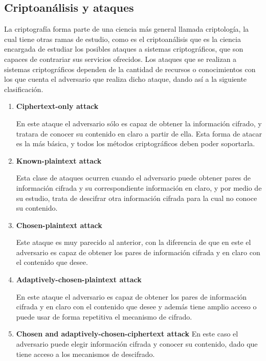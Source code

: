   \subsection{Criptoanálisis y ataques}

    La criptografía forma parte de una ciencia más general llamada
    criptología, la cual tiene otras ramas de estudio, como es el
    criptoanálisis que es la ciencia encargada de estudiar los posibles
    ataques a sistemas criptográficos, que son capaces de contrariar sus
    servicios ofrecidos.
    Los ataques que se realizan a sistemas criptográficos dependen de la 
    cantidad de recursos o conocimientos con los que cuenta el adversario 
    que realiza dicho ataque, dando así a la siguiente clasificación.

    \begin{enumerate}

      \item \textbf{Ciphertext-only attack}

        En este ataque el adversario sólo es capaz de obtener la información
        cifrado, y tratara de conocer su contenido en claro a partir de ella.
        Esta forma de atacar es la más básica, y todos los métodos
        criptográficos deben poder soportarla.

      \item \textbf{Known-plaintext attack}

        Esta clase de ataques ocurren cuando el adversario puede obtener pares
        de información cifrada y su correspondiente información en claro, y
        por medio de su estudio, trata de descifrar otra información cifrada
        para la cual no conoce su contenido.

      \item \textbf{Chosen-plaintext attack}

        Este ataque es muy parecido al anterior, con la diferencia de que en
        este el adversario es capaz de obtener los pares de información
        cifrada y en claro con el contenido que desee.

      \item \textbf{Adaptively-chosen-plaintext attack}

        En este ataque el adversario es capaz de obtener los pares de
        información cifrada y en claro con el contenido que desee y además 
        tiene amplio acceso o puede usar de forma repetitiva el mecanismo de
        cifrado.

      \item \textbf{Chosen and adaptively-chosen-ciphertext attack}
        En este caso el adversario puede elegir información cifrada y conocer
        su contenido, dado que tiene acceso a los mecanismos de descifrado.

    \end{enumerate}

